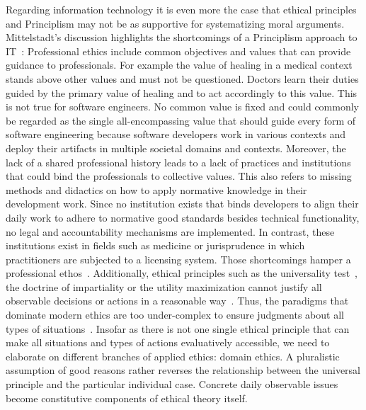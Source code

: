 \documentclass[manuscript,screen]{acmart}
\begin{document}
Regarding information technology it is even more the case that ethical principles and Principlism may not be as supportive for systematizing moral arguments. Mittelstadt's discussion highlights the shortcomings of a Principlism approach to IT~\cite{mittelstadt2019principles}: Professional ethics include common objectives and values that can provide guidance to professionals. For example the value of healing in a medical context stands above other values and must not be questioned. Doctors learn their duties guided by the primary value of healing and to act accordingly to this value. This is not true for software engineers. No common value is fixed and could commonly be regarded as the single all-encompassing value that should guide every form of software engineering because software developers work in various contexts and deploy their artifacts in multiple societal domains and contexts. Moreover, the lack of a shared professional history leads to a lack of practices and institutions that could bind the professionals to collective values. This also refers to missing methods and didactics on how to apply normative knowledge in their development work. Since no institution exists that binds developers to align their daily work to adhere to normative good standards besides technical functionality, no legal and accountability mechanisms are implemented. In contrast, these institutions exist in fields such as medicine or jurisprudence in which practitioners are subjected to a licensing system. Those shortcomings hamper a professional ethos~\cite{mittelstadt2019principles}. Additionally, ethical principles such as the universality test~\cite{apressyan2018kant}, the doctrine of impartiality or the utility maximization cannot justify all observable decisions or actions in a reasonable way~\cite{darwall1983impartial}. Thus, the paradigms that dominate modern ethics are too under-complex to ensure judgments about all types of situations~\cite[p.60]{nida2005menschliche}. Insofar as there is not one single ethical principle that can make all situations and types of actions evaluatively accessible, we need to elaborate on different branches of applied ethics: domain ethics. A pluralistic assumption of good reasons rather reverses the relationship between the universal principle and the particular individual case. Concrete daily observable issues become constitutive components of ethical theory itself. 
\end{document}
